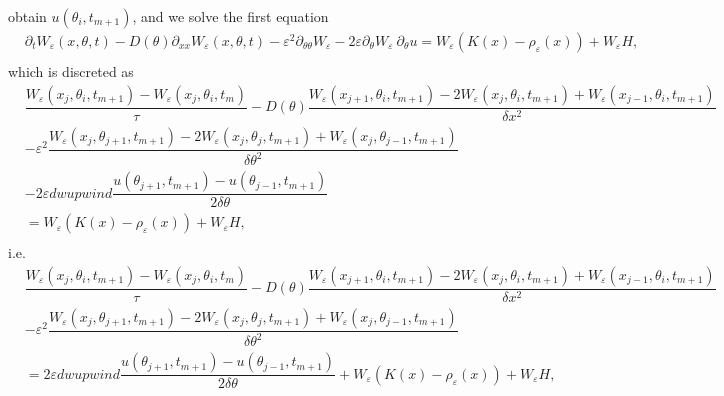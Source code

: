 \documentclass[preprint]{article}
\numberwithin{equation}{section}
\begin{document}
obtain $u(\theta_i, t_{m+1})$, and we solve the first equation
\begin{equation}
\begin{aligned}
&\partial_t W_\varepsilon(x,\theta,t) - D(\theta)\partial_{xx} W_\varepsilon(x,\theta,t) -\varepsilon^2\partial_{\theta\theta} W_\varepsilon - 2\varepsilon\partial_{\theta} W_\varepsilon~ \partial_\theta u = W_\varepsilon (K(x)-\rho_\varepsilon(x)) + W_\varepsilon H,\\
\end{aligned}
\end{equation}
which is discreted as
 \begin{equation}
\begin{aligned}
&\dfrac{ W_\varepsilon(x_j, \theta_i, t_{m+1}) - W_\varepsilon(x_j, \theta_i, t_m)}{\tau}-D(\theta)\dfrac{W_\varepsilon(x_{j+1},\theta_i, t_{m+1}) - 2W_\varepsilon(x_j,\theta_i,t_{m+1}) + W_\varepsilon(x_{j-1}, \theta_i, t_{m+1})}{\delta x^2} \\
&-\varepsilon^2\dfrac{W_\varepsilon(x_j,\theta_{j+1},t_{m+1})-2W_\varepsilon(x_j,\theta_{j}, t_{m+1})+W_\varepsilon(x_j,\theta_{j-1}, t_{m+1})}{\delta\theta^2} \\
&- 2\varepsilon dwupwind\dfrac{u(\theta_{j+1},t_{m+1}) -u(\theta_{j-1},t_{m+1})}{2\delta\theta} \\
&= W_\varepsilon (K(x)-\rho_\varepsilon(x)) + W_\varepsilon H,\\
\end{aligned}
\end{equation}
i.e.
 \begin{equation}
\begin{aligned}
&\dfrac{ W_\varepsilon(x_j, \theta_i, t_{m+1}) - W_\varepsilon(x_j, \theta_i, t_m)}{\tau}-D(\theta)\dfrac{W_\varepsilon(x_{j+1},\theta_i, t_{m+1}) - 2W_\varepsilon(x_j,\theta_i,t_{m+1}) + W_\varepsilon(x_{j-1}, \theta_i, t_{m+1})}{\delta x^2} \\
&-\varepsilon^2\dfrac{W_\varepsilon(x_j,\theta_{j+1},t_{m+1})-2W_\varepsilon(x_j,\theta_{j}, t_{m+1})+W_\varepsilon(x_j,\theta_{j-1}, t_{m+1})}{\delta\theta^2} \\
&= 2\varepsilon dwupwind\dfrac{u(\theta_{j+1},t_{m+1}) -u(\theta_{j-1},t_{m+1})}{2\delta\theta}
+ W_\varepsilon (K(x)-\rho_\varepsilon(x)) + W_\varepsilon H,\\
\end{aligned}
\end{equation}
\end{document}
